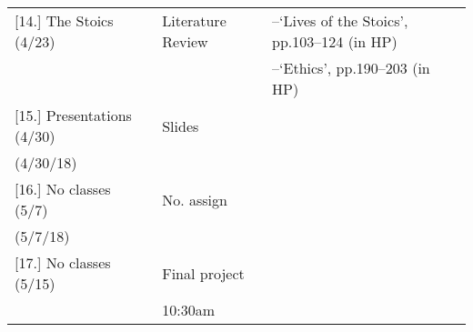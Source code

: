 \documentclass[article,oneside]{memoir}
\begin{document}
\begin{center}
\begin{longtable}{p{4.5cm}p{2cm}p{6cm}}
[14.] The Stoics	(4/23)			  	& Literature Review		&--`Lives of the Stoics', pp.103--124 (in HP) \\ 
			    				  	&		      		& --`Ethics', pp.190--203 (in HP) \\[1.8\baselineskip]

[15.] Presentations (4/30)				& Slides 			& \\ 
(4/30/18)				 		     	&			       	& \\ [1.8\baselineskip]

[16.] No classes (5/7)		    		& No. assign			& \\ 
(5/7/18)				    		  	& 			     	& \\ [1.8\baselineskip]

[17.] No classes (5/15)			    	& Final project		& \\ 
				      				&  10:30am    		& \\

\end{longtable}
\end{center}



\end{document}
